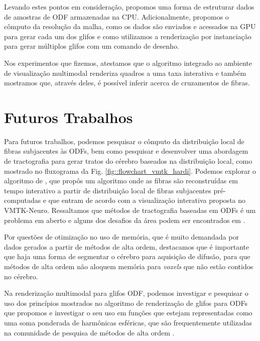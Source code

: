 \documentclass[
    12pt,                %
    oneside,            %
    a4paper,            %
    english,            %
    french,                %
    spanish,            %
    brazil                %
    ]{abntex2}
\begin{document}
Levando estes pontos em consideração, propomos uma forma de estruturar dados de amostras de ODF armazenadas na CPU. Adicionalmente, propomos o cômputo da resolução da malha, como os dados são enviados e acessados na GPU para gerar cada um dos glifos e como utilizamos a renderização por instanciação para gerar múltiplos glifos com um comando de desenho.

Nos experimentos que fizemos, atestamos que o algoritmo integrado ao ambiente de visualização multimodal renderiza quadros a uma taxa interativa e também mostramos que, através deles, é possível inferir acerca de cruzamentos de fibras.

\section{Futuros Trabalhos}

Para futuros trabalhos, podemos pesquisar o cômputo da distribuição local de fibras subjacentes às ODFs, bem como pesquisar e desenvolver uma abordagem de tractografia para gerar tratos do cérebro baseados na distribuição local, como mostrado no fluxograma da Fig. \ref{fig::flowchart_vmtk_hardi}. Podemos explorar o algoritmo de , que propôs um algoritmo onde as fibras são reconstruídas em tempo interativo a partir de distribuição local de fibras subjacentes pré-computadas e que entram de acordo com a visualização interativa proposta no VMTK-Neuro. Ressaltamos que métodos de tractografia baseadas em ODFs é um problema em aberto e alguns dos desafios da área podem ser encontrados em .

Por questões de otimização no uso de memória, que é muito demandada por dados gerados a partir de métodos de alta ordem, destacamos que é importante que haja uma forma de segmentar o cérebro para aquisição de difusão, para que métodos de alta ordem não aloquem memória para \textit{voxels} que não estão contidos no cérebro.


Na renderização multimodal para glifos ODF, podemos investigar e pesquisar o uso dos princípios mostrados no algoritmo de renderização de glifos para ODFs que propomos e investigar o seu uso em funções que estejam representadas como uma soma ponderada de harmônicas esféricas, que são frequentemente utilizadas na comunidade de pesquisa de métodos de alta ordem \cite{descoteaux2007_QBI, Tournier2004DirectEO, tournier2007}.


\end{document}

